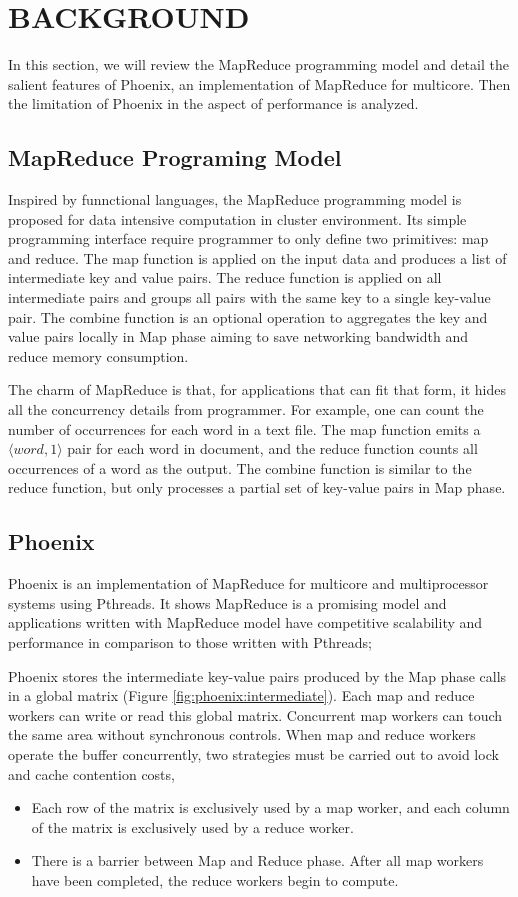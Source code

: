 \section{BACKGROUND}
In this section, we will review the MapReduce programming
model and detail the salient features of Phoenix, 
an implementation of MapReduce for multicore.
Then the limitation of Phoenix in the aspect of performance is analyzed.

\subsection{MapReduce Programing Model}
Inspired  by funnctional languages, the MapReduce programming model is 
proposed for data intensive computation in cluster environment.
Its simple programming interface require programmer 
to only define two primitives: map and reduce.
The map function is applied on the input data and 
produces a list of intermediate key and value pairs.
The reduce function is applied on all intermediate
pairs and  groups all pairs with the same key to a single
key-value pair. 
The combine function is an optional operation 
to aggregates the key and value pairs locally in Map phase 
aiming to save networking bandwidth and reduce memory consumption.


The charm of MapReduce is that, 
for applications that can fit that form, 
it hides all the concurrency details from  programmer. 
For example, 
one can count the number of occurrences for each word in a text file. 
The map function emits a $\langle word, 1\rangle$ pair for each word in document, 
and the reduce function counts all occurrences of a word as the output. 
The combine function is similar to the reduce function, 
but only processes a partial set of key-value pairs in Map phase.


\subsection{Phoenix}
Phoenix is an implementation of MapReduce for multicore  and multiprocessor systems using Pthreads\cite{}.
It shows MapReduce is a promising model  and applications written with MapReduce model
have competitive scalability and performance in comparison to those
written with Pthreads\cite{ranger2007phoenix};

Phoenix stores the intermediate key-value pairs produced 
by the Map phase calls in a global matrix (Figure \ref{fig:phoenix:intermediate}). 
Each map and reduce workers can write or read this global matrix. 
Concurrent map workers can touch the same area without synchronous controls.
When map and reduce workers operate the buffer concurrently, 
two  strategies must be carried out to avoid lock and cache contention costs,
\begin{itemize}
	\item Each row of the matrix is exclusively used by a map worker, 
and each column of the matrix is exclusively used by a reduce worker. 
	\item There is a barrier between Map and Reduce phase.
After all map workers have been completed, the reduce workers begin to compute. 
\end{itemize}


